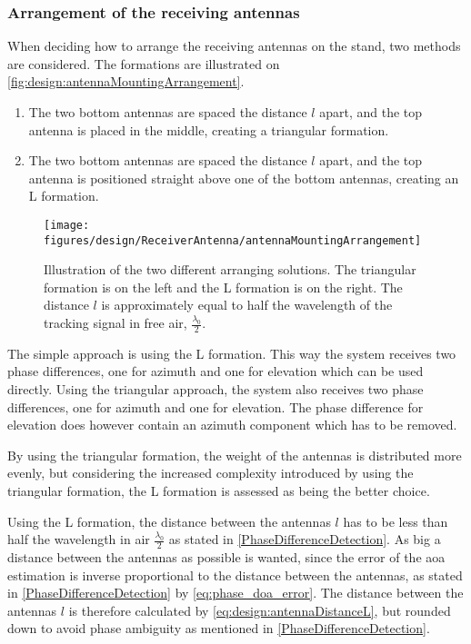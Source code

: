 \subsubsection{Arrangement of the receiving antennas}
When deciding how to arrange the receiving antennas on the stand, two methods are considered. The formations are illustrated on \autoref{fig:design:antennaMountingArrangement}.
\begin{enumerate}
\item The two bottom antennas are spaced the distance $l$ apart, and the top antenna is placed in the middle, creating a triangular formation. 
\item The two bottom antennas are spaced the distance $l$ apart, and the top antenna is positioned straight above one of the bottom antennas, creating an L formation.
\end{enumerate}

\begin{figure}[h]
\centering
\texttt{[image: figures/design/ReceiverAntenna/antennaMountingArrangement]}
\caption{Illustration of the two different arranging solutions. The triangular formation is on the left and the L formation is on the right. The distance $l$ is approximately equal to half the wavelength of the tracking signal in free air, $\frac{\lambda_0}{2}$.}\label{fig:design:antennaMountingArrangement}
\end{figure}

The simple approach is using the L formation. This way the system receives two phase differences, one for azimuth and one for elevation which can be used directly. Using the triangular approach, the system also receives two phase differences, one for azimuth and one for elevation. The phase difference for elevation does however contain an azimuth component which has to be removed.

By using the triangular formation, the weight of the antennas is distributed more evenly, but considering the increased complexity introduced by using the triangular formation, the L formation is assessed as being the better choice.

Using the L formation, the distance between the antennas $l$ has to be less than half the wavelength in air $\frac{\lambda_0}{2}$ as stated in \autoref{PhaseDifferenceDetection}. As big a distance between the antennas as possible is wanted, since the error of the \gls{aoa} estimation is inverse proportional to the distance between the antennas, as stated in \autoref{PhaseDifferenceDetection} by \autoref{eq:phase_doa_error}. The distance between the antennas $l$ is therefore calculated by \autoref{eq:design:antennaDistanceL}, but rounded down to avoid phase ambiguity as mentioned in \autoref{PhaseDifferenceDetection}.

